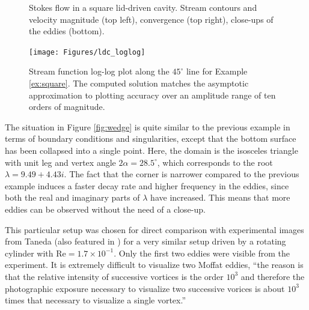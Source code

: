 \begin{example}
\begin{figure}[H]
\caption{Stokes flow in a square lid-driven cavity. Stream contours and velocity magnitude (top left), convergence (top right), close-ups of the eddies (bottom).}
\label{fig:ldc}
\end{figure} 
\begin{figure}[H]
\centering
\texttt{[image: Figures/ldc\_loglog]}
\caption{Stream function log-log plot along the $45^\circ$ line for Example \ref{ex:square}. The computed solution matches the asymptotic approximation to plotting accuracy over an amplitude range of ten orders of magnitude.}
\label{fig:ldc_loglog}
\end{figure}

\end{example}


\begin{example}
\label{ex:triangle}
The situation in Figure \ref{fig:wedge} is quite similar to the previous example in terms of boundary conditions and singularities, except that the bottom surface has been collapsed into a single point. Here, the domain is the isosceles triangle with unit leg and vertex angle $2\alpha = 28.5^\circ$, which corresponds to the root $\lambda = 9.49 + 4.43i$. The fact that the corner is narrower compared to the previous example induces a faster decay rate and higher frequency in the eddies, since both the real and imaginary parts of $\lambda$ have increased. This means that more eddies can be observed without the need of a close-up.

This particular setup was chosen for direct comparison with experimental images from  Taneda \cite[Fig.~19]{taneda79} (also featured in \cite[Fig.~10]{vandyke82}) for a very similar setup driven by a rotating cylinder with $\text{Re}=1.7\times10^{-1}$. Only the first two eddies were visible from the experiment. It is extremely difficult to visualize two Moffat eddies, ``the reason is that the relative intensity of successive vortices is the order $10^3$ and therefore the photographic exposure necessary to visualize two successive vorices is about $10^3$ times that necessary to visualize a single vortex.''


\end{example}
